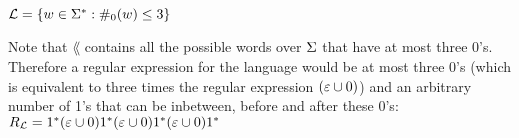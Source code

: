 $\mathcal{L} = \{ w \in \Sigma^* : \#_0(w) \leq 3\}$

Note that $\lang$ contains all the possible words over $\Sigma$ that have at most three 0's.
Therefore a regular expression for the language would be at most three 0's (which is equivalent to
three times the regular expression $(\varepsilon \cup 0)$) and an arbitrary number of 1's that can be inbetween,
before and after these 0's: \\
$R_{\mathcal{L}} =1^*(\varepsilon \cup 0)1^*(\varepsilon \cup 0)1^*(\varepsilon \cup 0)1^*$ \\
